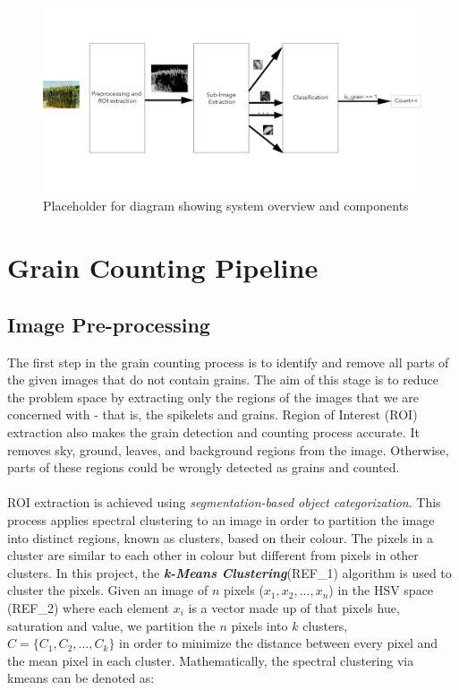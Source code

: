 \smallskip

\begin{figure}[ht!]
\centering
\includegraphics[scale=.4]{Images/design_pipeline}
\caption{Placeholder for diagram showing system overview and components}
\label{fig1}
\end{figure}

\smallskip

\goodbreak
\section{Grain Counting Pipeline}
\subsection{Image Pre-processing}
The first step in the grain counting process is to identify and remove all parts of the given images that do not contain grains. The aim of this stage is to reduce the problem space by extracting only the regions of the images that we are concerned with - that is, the spikelets and grains. Region of Interest (ROI) extraction also makes the grain detection and counting process accurate. It removes sky, ground, leaves, and background regions from the image. Otherwise, parts of these regions could be wrongly detected as grains and counted.\\ \\
%
ROI extraction is achieved using \textit{segmentation-based object categorization}. This process applies spectral clustering to an image in order to partition the image into distinct regions, known as clusters, based on their colour. The pixels in a cluster are similar to each other in colour but different from pixels in other clusters. In this project, the \textit{\textbf{k-Means Clustering}}(REF\_1) algorithm is used to cluster the pixels. Given an image of $n$ pixels ($x_1, x_2, ..., x_n$) in the HSV space (REF\_2) where each element $x_i$ is a vector made up of that pixels hue, saturation and value, we partition the $n$ pixels into $k$ clusters, $C = \{C_1, C_2, ..., C_k\}$ in order to minimize the distance between every pixel and the mean pixel in each cluster. Mathematically, the spectral clustering via kmeans can be denoted as:

